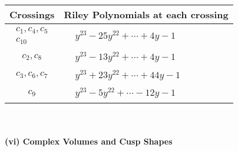 \documentclass[1p]{elsarticle_modified}
\theoremstyle{definition}
\begin{document}
\begin{tabular}{m{50pt}|m{274pt}}
Crossings & \hspace{64pt}Riley Polynomials at each crossing \\
\hline $$\begin{aligned}c_{1},c_{4},c_{5}\\c_{10}\end{aligned}$$&$\begin{aligned}
&y^{23}-25 y^{22}+\cdots+4 y-1
\end{aligned}$\\
\hline $$\begin{aligned}c_{2},c_{8}\end{aligned}$$&$\begin{aligned}
&y^{23}-13 y^{22}+\cdots+4 y-1
\end{aligned}$\\
\hline $$\begin{aligned}c_{3},c_{6},c_{7}\end{aligned}$$&$\begin{aligned}
&y^{23}+23 y^{22}+\cdots+44 y-1
\end{aligned}$\\
\hline $$\begin{aligned}c_{9}\end{aligned}$$&$\begin{aligned}
&y^{23}-5 y^{22}+\cdots-12 y-1
\end{aligned}$\\
\hline
\end{tabular}\\~\\
\newpage\flushleft \textbf{(vi) Complex Volumes and Cusp Shapes}
\end{document}

